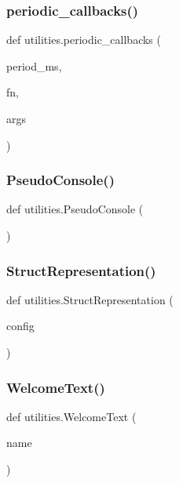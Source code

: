\mbox{\label{namespaceutilities_a35dce39ce5efc1ca1a29b30ffc373bd0}} 
\subsubsection{\texorpdfstring{periodic\+\_\+callbacks()}{periodic\_callbacks()}}
{\footnotesize\ttfamily def utilities.\+periodic\+\_\+callbacks (\begin{DoxyParamCaption}\item[{}]{period\+\_\+ms,  }\item[{}]{fn,  }\item[{}]{args }\end{DoxyParamCaption})}

\mbox{\label{namespaceutilities_a85150e8e264f76b149785770210a7f1a}} 
\subsubsection{\texorpdfstring{Pseudo\+Console()}{PseudoConsole()}}
{\footnotesize\ttfamily def utilities.\+Pseudo\+Console (\begin{DoxyParamCaption}{ }\end{DoxyParamCaption})}

\mbox{\label{namespaceutilities_aa2added918da29f1fa28d3ea24d570d9}} 
\subsubsection{\texorpdfstring{Struct\+Representation()}{StructRepresentation()}}
{\footnotesize\ttfamily def utilities.\+Struct\+Representation (\begin{DoxyParamCaption}\item[{}]{config }\end{DoxyParamCaption})}

\mbox{\label{namespaceutilities_a7c64a494f834c091373f2bb148dc2e8c}} 
\subsubsection{\texorpdfstring{Welcome\+Text()}{WelcomeText()}}
{\footnotesize\ttfamily def utilities.\+Welcome\+Text (\begin{DoxyParamCaption}\item[{}]{name }\end{DoxyParamCaption})}

